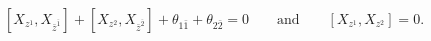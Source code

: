 \begin{equation}\label{asdym}
 [X_{z^1},X_{\bar{z}^{\bar{1}}}]+ [X_{z^2},X_{\bar{z}^{\bar{2}}}]
 +\theta_{1\bar{1}}+\theta_{2\bar{2}}=0\qquad\text{and}\qquad
 [X_{z^1},X_{z^2}]=0.
\end{equation} 
